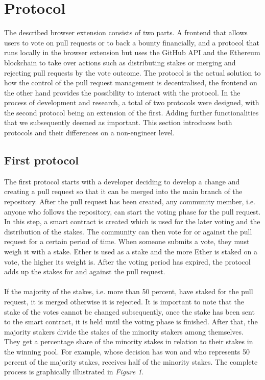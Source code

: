 \documentclass[sigconf]{acmart}
\begin{document}
\section{Protocol}
The described browser extension consists of two parts. A frontend that allows users to vote on pull requests or to back 
a bounty financially, and a protocol that runs locally in the browser extension but uses the GitHub API and the Ethereum 
blockchain to take over actions such as distributing stakes or merging and rejecting pull requests by the vote outcome.
The protocol is the actual solution to how the control of the pull request management is decentralised, the frontend on the 
other hand provides the possibility to interact with the protocol. In the process of development and research, a total of two 
protocols were designed, with the second protocol being an extension of the first. Adding further functionalities that we 
subsequently deemed as important. This section introduces both protocols and their differences on a non-engineer level.

\subsection{First protocol}
The first protocol starts with a developer deciding to develop a change and creating a pull request so that it can be merged into the 
main branch of the repository. After the pull request has been created, any community member, i.e. anyone who follows the repository, 
can start the voting phase for the pull request. In this step, a smart contract is created which is used for the later voting and the distribution
 of the stakes. The community can then vote for or against the pull request for a certain period of time.
When someone submits a vote, they must weigh it with a stake. Ether is used as a stake and the more Ether is staked on a vote, 
the higher its weight is. After the voting period has expired, the protocol adds up the stakes for and against the pull request. \\ \\
If the majority of the stakes, i.e. more than 50 percent, have staked for the pull request, it is merged otherwise it is rejected.
It is important to note that the stake of the votes cannot be changed subsequently, once the stake has been sent to the smart contract, 
it is held until the voting phase is finished. After that, the majority stakers divide the stakes of the minority stakers among themselves. 
They get a percentage share of the minority stakes in relation to their stakes in the winning pool. For example, whose decision has won
 and who represents 50 percent of the majority stakes, receives half of the minority stakes. The complete process is graphically 
illustrated in \textit{Figure 1}.
\end{document}
